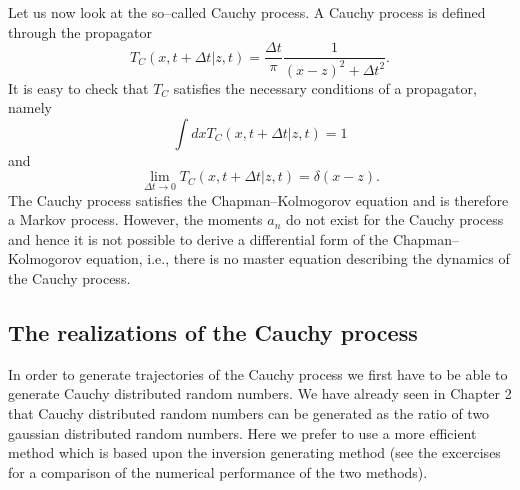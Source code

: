 Let us now look at the so--called Cauchy process. A Cauchy process is defined
through the propagator
\begin{displaymath}
  T_C(x,t+\Delta t|z,t) = \frac{\Delta t}{\pi} \frac{1}{(x-z)^2 + \Delta t^2}.
\end{displaymath}
It is easy to check that $T_C$ satisfies the necessary conditions of a
propagator, namely
\begin{displaymath}
  \int dx T_C (x,t+\Delta t|z,t) =1
\end{displaymath}
and
\begin{displaymath}
  \lim_{\Delta t \rightarrow 0} T_C (x,t+\Delta t|z,t) = \delta(x-z).
\end{displaymath}
The Cauchy process satisfies the Chapman--Kolmogorov equation and is 
therefore a Markov process. However, the moments $a_n$ do not exist for the
Cauchy process and hence it is not possible to derive a differential form of
the Chapman--Kolmogorov equation, i.e., there is no master equation describing
the dynamics of the Cauchy process.

\subsection{The realizations of the Cauchy process}
In order to generate trajectories of the Cauchy process we first have to be
able to generate Cauchy distributed random numbers. We have already seen in
Chapter 2 that Cauchy distributed random numbers can be generated as the ratio
 of two gaussian distributed random numbers. Here we prefer to use a more
 efficient method which is based upon the inversion generating method (see the
 excercises for a comparison of the numerical performance of the two methods).


